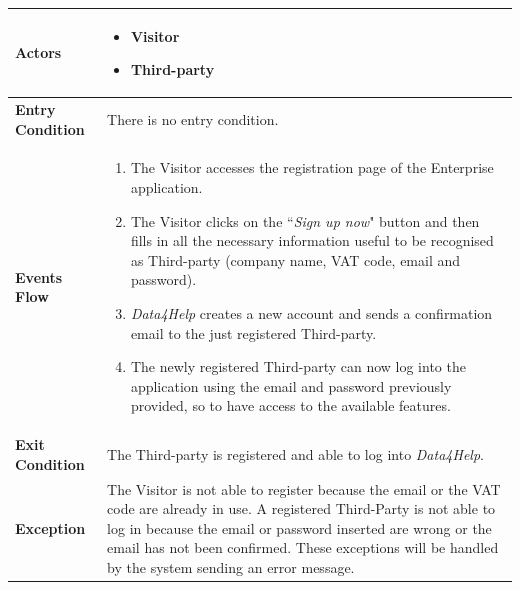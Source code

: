             \begin{table}[H]
            	\centering
                \begin{tabular}{|p{3cm}|p{8.2cm}|}
                    \hline
                    \textbf{Actors} &  \begin{itemize}
                        \item Visitor
                        \item Third-party
                    \end{itemize} \\
                     \hline
                    \textbf{Entry Condition} & There is no entry condition. \\
                     \hline
                    \textbf{Events Flow} & \begin{enumerate}
                        \item The Visitor accesses the registration page of the Enterprise application.
                        \item The Visitor clicks on the ``\emph{Sign up now}" button and then fills in all the necessary information useful to be recognised as Third-party (company name, VAT code, email and password).
                        \item \emph{Data4Help} creates a new account and sends a confirmation email to the just registered Third-party.
                        \item The newly registered Third-party can now log into the application using the email and password previously provided, so to have access to the available features.
                    \end{enumerate} \\
                     \hline
                    \textbf{Exit Condition} & The Third-party is registered and able to log into \emph{Data4Help}. \\
                     \hline
                    \textbf{Exception} & The Visitor is not able to register because the email or the VAT code                      are already in use. \newline
                                         A registered Third-Party is not able to log in because the email or password inserted are wrong or the email has not been confirmed. \newline
                                         These exceptions will be handled by the system sending an error message. \\
                     \hline
                \end{tabular}  
            \end{table}
            

